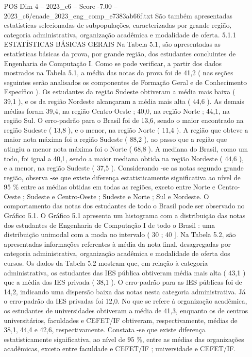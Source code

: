 \begin{textsample}{POS Dim 4 – 2023\_c6 – Score -7.00 – 2023\_c6/enade\_2023\_eng\_comp\_e7383ab66f.txt}
São também apresentadas estatísticas selecionadas de subpopulações, caracterizadas por grande região, categoria administrativa, organização acadêmica e modalidade de oferta. 5.1.1 ESTATÍSTICAS BÁSICAS GERAIS Na Tabela 5.1, são apresentadas as estatísticas básicas da prova, por grande região, dos estudantes concluintes de Engenharia de Computação I.
Como se pode verificar, a partir dos dados mostrados na Tabela 5.1, a média das notas da prova foi de 41,2 ( nas seções seguintes serão analisados os componentes de Formação Geral e de Conhecimento Específico ).
Os estudantes da região Sudeste obtiveram a média mais baixa ( 39,1 ), e os da região Nordeste alcançaram a média mais alta ( 44,6 ).
As demais médias foram 39,4, na região Centro-Oeste ; 40,0, na região Norte ; 44,1, na região Sul.
O erro-padrão para o Brasil foi de 13,6, sendo o maior encontrado na região Sudeste ( 13,8 ), e o menor, na região Norte ( 11,4 ).
A região que obteve a maior nota máxima foi a região Sudeste ( 88,2 ), ao passo que a região que atingiu a menor nota máxima foi o Norte ( 68,8 ).
A mediana do Brasil, como um todo, foi igual a 40,1, sendo a maior mediana obtida na região Nordeste ( 44,6 ), e a menor, na região Sudeste ( 37,5 ).
Considerando -se as notas segundo grande região, observa -se que existe diferença estatisticamente significativa ao nível de 95 \% entre as médias obtidas em todas as regiões, exceto entre Norte e Centro-Oeste ; Sudeste e Centro-Oeste ; Sudeste e Norte ; Sul e Nordeste.
O comportamento das notas dos estudantes de todo o Brasil pode ser observado no Gráfico 5.1.
O Gráfico 5.1 apresenta um histograma com a distribuição das notas dos estudantes de Engenharia de Computação I de todo o Brasil : uma distribuição unimodal com a moda no intervalo ( 30 ; 40 ].
Na Tabela 5.2, são apresentadas informações referentes à média da nota final, desagregadas por categoria administrativa, organização acadêmica e modalidade de oferta dos cursos.
Os dados da Tabela 5.2 mostram que, em relação à categoria administrativa, os estudantes das IES pública obtiveram média mais alta ( 43,1 ) que a média das IES privada ( 38,1 ).
O erro-padrão para as IES públicas foi de 14,2, indicando uma dispersão baixa das notas nesta categoria administrativa.
Já o erro-padrão da IES privadas foi 12,0.
No que se refere à organização acadêmica, os estudantes de universidades obtiveram a média de 41,3, enquanto os de centros universitários, faculdades e CEFET/IF obtiveram, respectivamente, médias de 38,1, 44,4 e 42,6, respectivamente.
Constata -se que existe diferença estatisticamente significativa, ao nível de 95 \%, entre as médias das organizações acadêmicas, exceto entre faculdade e CEFET/IF ; universidade e CEFET/IF.

\end{textsample}
